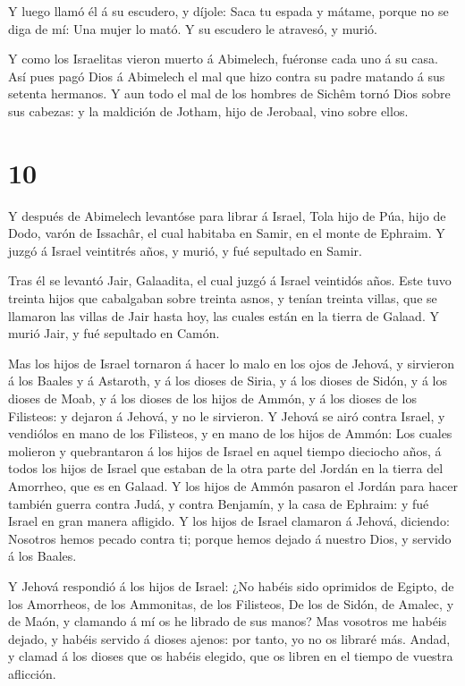  Y luego llamó él á su escudero, y díjole: Saca tu espada y
mátame, porque no se diga de mí: Una mujer lo mató. Y su escudero le
atravesó, y murió.

 Y como los Israelitas vieron muerto á Abimelech, fuéronse
cada uno á su casa.  Así pues pagó Dios á Abimelech el mal
que hizo contra su padre matando á sus setenta hermanos.  Y
aun todo el mal de los hombres de Sichêm tornó Dios sobre sus cabezas: y
la maldición de Jotham, hijo de Jerobaal, vino sobre ellos.

\hypertarget{section-9}{%
\section{10}\label{section-9}}

 Y después de Abimelech levantóse para librar á Israel, Tola
hijo de Púa, hijo de Dodo, varón de Issachâr, el cual habitaba en Samir,
en el monte de Ephraim.  Y juzgó á Israel veintitrés años, y
murió, y fué sepultado en Samir.

 Tras él se levantó Jair, Galaadita, el cual juzgó á Israel
veintidós años.  Este tuvo treinta hijos que cabalgaban
sobre treinta asnos, y tenían treinta villas, que se llamaron las villas
de Jair hasta hoy, las cuales están en la tierra de Galaad. 
Y murió Jair, y fué sepultado en Camón.

 Mas los hijos de Israel tornaron á hacer lo malo en los
ojos de Jehová, y sirvieron á los Baales y á Astaroth, y á los dioses de
Siria, y á los dioses de Sidón, y á los dioses de Moab, y á los dioses
de los hijos de Ammón, y á los dioses de los Filisteos: y dejaron á
Jehová, y no le sirvieron.  Y Jehová se airó contra Israel,
y vendiólos en mano de los Filisteos, y en mano de los hijos de Ammón:
 Los cuales molieron y quebrantaron á los hijos de Israel en
aquel tiempo dieciocho años, á todos los hijos de Israel que estaban de
la otra parte del Jordán en la tierra del Amorrheo, que es en Galaad.
 Y los hijos de Ammón pasaron el Jordán para hacer también
guerra contra Judá, y contra Benjamín, y la casa de Ephraim: y fué
Israel en gran manera afligido.  Y los hijos de Israel
clamaron á Jehová, diciendo: Nosotros hemos pecado contra ti; porque
hemos dejado á nuestro Dios, y servido á los Baales.

 Y Jehová respondió á los hijos de Israel: ¿No habéis sido
oprimidos de Egipto, de los Amorrheos, de los Ammonitas, de los
Filisteos,  De los de Sidón, de Amalec, y de Maón, y
clamando á mí os he librado de sus manos?  Mas vosotros me
habéis dejado, y habéis servido á dioses ajenos: por tanto, yo no os
libraré más.  Andad, y clamad á los dioses que os habéis
elegido, que os libren en el tiempo de vuestra aflicción.

